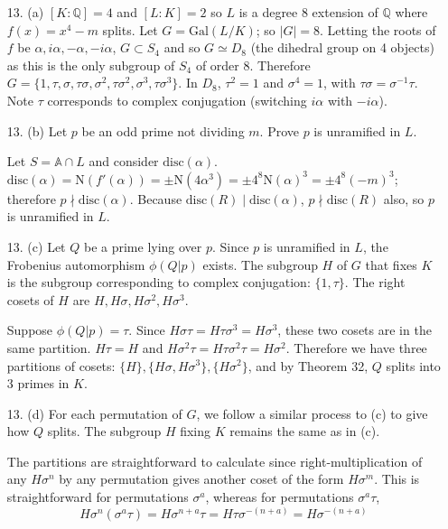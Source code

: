 \documentclass{article}
\newcommand{\Q}[0]{\mathbb{Q}}
\newcommand{\norm}[0]{\text{N}}
\newcommand{\disc}[1]{\text{disc}(#1)}
\newcommand{\ringofintegers}[1]{\mathbb{A} \cap #1}
\begin{document}
\begin{enumerate}
\item [13. (a)] $[K : \Q] = 4$ and $[L : K] = 2$ so $L$ is a degree 8 extension of $\Q$ where $f(x) = x^4 - m$ splits.  Let $G = \text{Gal}(L / K)$; so $|G| = 8$.  Letting the roots of $f$ be $\alpha, i\alpha, -\alpha, -i\alpha$, $G \subset S_4$ and so $G \simeq D_8$ (the dihedral group on 4 objects) as this is the only subgroup of $S_4$ of order 8.  Therefore $G = \{ 1, \tau, \sigma, \tau \sigma, \sigma^2, \tau \sigma^2, \sigma^3, \tau \sigma^3 \}$.  In $D_8$, $\tau^2 = 1$ and $\sigma^4 = 1$, with $\tau \sigma = \sigma^{-1} \tau$.  Note $\tau$ corresponds to complex conjugation (switching $i\alpha$ with $-i\alpha$).

\item [13. (b)] Let $p$ be an odd prime not dividing $m$.  Prove $p$ is unramified in $L$.

Let $S = \ringofintegers{L}$ and consider $\disc{\alpha}$.  $\disc{\alpha} = \norm(f'(\alpha)) = \pm \norm(4\alpha^3) = \pm 4^8 \norm(\alpha)^3 = \pm 4^8 (-m)^3$; therefore $p \nmid \disc{\alpha}$.  Because $\disc{R} \mid \disc{\alpha}$, $p \nmid \disc{R}$ also, so $p$ is unramified in $L$.

\item [13. (c)] Let $Q$ be a prime lying over $p$.  Since $p$ is unramified in $L$, the Frobenius automorphism $\phi(Q|p)$ exists.  The subgroup $H$ of $G$ that fixes $K$ is the subgroup corresponding to complex conjugation: $\{1, \tau \}$.  The right cosets of $H$ are $H, H\sigma, H\sigma^2, H\sigma^3$.

Suppose $\phi(Q|p) = \tau$. Since $H\sigma\tau = H\tau \sigma^3 = H\sigma^3$, these two cosets are in the same partition.  $H\tau = H$ and $H\sigma^2 \tau = H\tau \sigma^2 \tau = H\sigma^2$.  Therefore we have three partitions of cosets: $\{H\}, \{H\sigma, H\sigma^3 \}, \{H\sigma^2\}$, and by Theorem 32, $Q$ splits into 3 primes in $K$.

\item [13. (d)] For each permutation of $G$, we follow a similar process to (c) to give how $Q$ splits.  The subgroup $H$ fixing $K$ remains the same as in (c).

The partitions are straightforward to calculate since right-multiplication of any $H\sigma^{n}$ by any permutation gives another coset of the form $H\sigma^{m}$.  This is straightforward for permutations $\sigma^a$, whereas for permutations $\sigma^a \tau$, \[H\sigma^n(\sigma^a \tau) = H\sigma^{n + a}\tau = H\tau\sigma^{-(n + a)} = H\sigma^{-(n + a)} \]


\end{enumerate}
\end{document}
